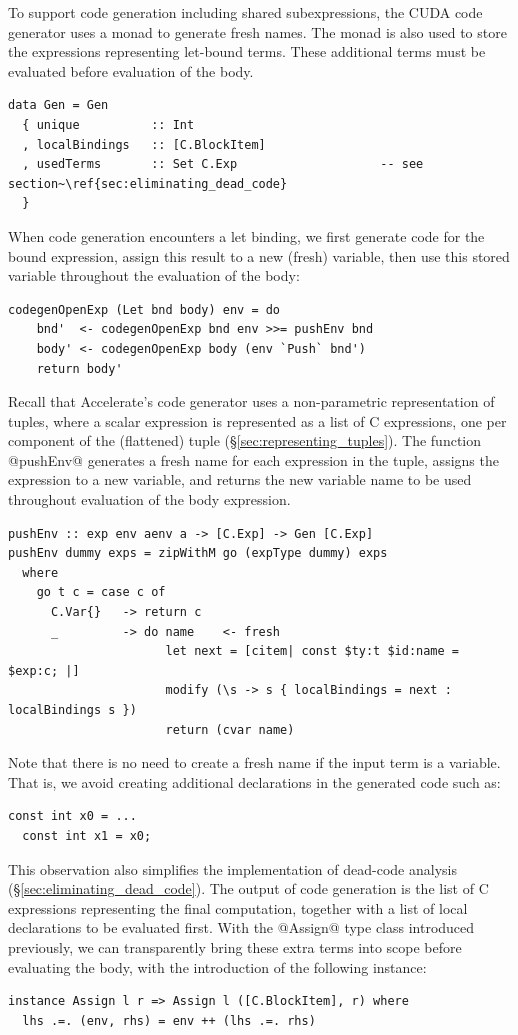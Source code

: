 To support code generation including shared subexpressions, the CUDA code
generator uses a monad to generate fresh names. The monad is also used to store
the expressions representing let-bound terms. These additional terms must be
evaluated before evaluation of the body.
%
\begin{lstlisting}[style=haskell]
data Gen = Gen
  { unique          :: Int
  , localBindings   :: [C.BlockItem]
  , usedTerms       :: Set C.Exp                    -- see section~\ref{sec:eliminating_dead_code}
  }
\end{lstlisting}

When code generation encounters a let binding, we first generate code for the
bound expression, assign this result to a new (fresh) variable, then use this
stored variable throughout the evaluation of the body:
%
\begin{lstlisting}[style=haskell]
codegenOpenExp (Let bnd body) env = do
    bnd'  <- codegenOpenExp bnd env >>= pushEnv bnd
    body' <- codegenOpenExp body (env `Push` bnd')
    return body'
\end{lstlisting}

Recall that Accelerate's \CUDA code generator uses a non-parametric
representation of tuples, where a scalar expression is represented as a list of
C expressions, one per component of the (flattened) tuple
(\S\ref{sec:representing_tuples}). The function @pushEnv@ generates a fresh
name for each expression in the tuple, assigns the expression to a new variable,
and returns the new variable name to be used throughout evaluation of the body
expression.
%
\begin{lstlisting}[style=haskell]
pushEnv :: exp env aenv a -> [C.Exp] -> Gen [C.Exp]
pushEnv dummy exps = zipWithM go (expType dummy) exps
  where
    go t c = case c of
      C.Var{}   -> return c
      _         -> do name    <- fresh
                      let next = [citem| const $ty:t $id:name = $exp:c; |]
                      modify (\s -> s { localBindings = next : localBindings s })
                      return (cvar name)
\end{lstlisting}
%
Note that there is no need to create a fresh name if the input term is a
variable. That is, we avoid creating additional declarations in the generated
code such as:
%
\begin{lstlisting}[language=cuda]
  const int x0 = ...
  const int x1 = x0;
\end{lstlisting}
%
This observation also simplifies the implementation of dead-code analysis
(\S\ref{sec:eliminating_dead_code}). The output of code generation is the list
of C expressions representing the final computation, together with a list of
local declarations to be evaluated first. With the @Assign@ type class
introduced previously, we can transparently bring these extra terms into scope
before evaluating the body, with the introduction of the following instance:
%
\begin{lstlisting}[style=haskell]
instance Assign l r => Assign l ([C.BlockItem], r) where
  lhs .=. (env, rhs) = env ++ (lhs .=. rhs)
\end{lstlisting}


